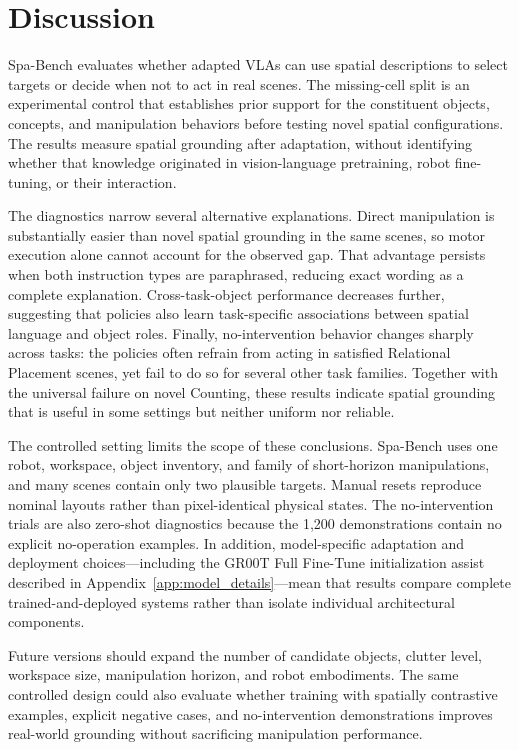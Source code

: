 \documentclass[conference]{IEEEtran}
\begin{document}
\section{Discussion}

Spa-Bench evaluates whether adapted VLAs can use spatial descriptions to select targets or decide when not to act in real scenes. The missing-cell split is an experimental control that establishes prior support for the constituent objects, concepts, and manipulation behaviors before testing novel spatial configurations. The results measure spatial grounding after adaptation, without identifying whether that knowledge originated in vision-language pretraining, robot fine-tuning, or their interaction.

The diagnostics narrow several alternative explanations. Direct manipulation is substantially easier than novel spatial grounding in the same scenes, so motor execution alone cannot account for the observed gap. That advantage persists when both instruction types are paraphrased, reducing exact wording as a complete explanation. Cross-task-object performance decreases further, suggesting that policies also learn task-specific associations between spatial language and object roles. Finally, no-intervention behavior changes sharply across tasks: the policies often refrain from acting in satisfied Relational Placement scenes, yet fail to do so for several other task families. Together with the universal failure on novel Counting, these results indicate spatial grounding that is useful in some settings but neither uniform nor reliable.

The controlled setting limits the scope of these conclusions. Spa-Bench uses one robot, workspace, object inventory, and family of short-horizon manipulations, and many scenes contain only two plausible targets. Manual resets reproduce nominal layouts rather than pixel-identical physical states. The no-intervention trials are also zero-shot diagnostics because the 1,200 demonstrations contain no explicit no-operation examples. In addition, model-specific adaptation and deployment choices---including the GR00T Full Fine-Tune initialization assist described in Appendix~\ref{app:model_details}---mean that results compare complete trained-and-deployed systems rather than isolate individual architectural components.

Future versions should expand the number of candidate objects, clutter level, workspace size, manipulation horizon, and robot embodiments. The same controlled design could also evaluate whether training with spatially contrastive examples, explicit negative cases, and no-intervention demonstrations improves real-world grounding without sacrificing manipulation performance.
\end{document}
